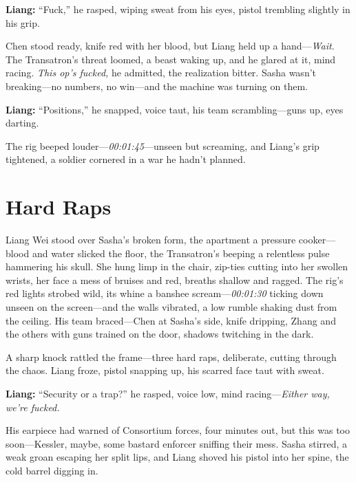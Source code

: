 \documentclass[12pt]{book}
\begin{document}
\vspace{0.5em}
\textbf{Liang:} “Fuck,” he rasped, wiping sweat from his eyes, pistol trembling slightly in his grip.

Chen stood ready, knife red with her blood, but Liang held up a hand—\emph{Wait.} The Transatron’s threat loomed, a beast waking up, and he glared at it, mind racing. \emph{This op’s fucked,} he admitted, the realization bitter. Sasha wasn’t breaking—no numbers, no win—and the machine was turning on them. 

\vspace{0.5em}
\textbf{Liang:} “Positions,” he snapped, voice taut, his team scrambling—guns up, eyes darting.

The rig beeped louder—\emph{00:01:45}—unseen but screaming, and Liang’s grip tightened, a soldier cornered in a war he hadn’t planned.

\vspace{1em}

\section{Hard Raps}

Liang Wei stood over Sasha’s broken form, the apartment a pressure cooker—blood and water slicked the floor, the Transatron’s beeping a relentless pulse hammering his skull. She hung limp in the chair, zip-ties cutting into her swollen wrists, her face a mess of bruises and red, breaths shallow and ragged. The rig’s red lights strobed wild, its whine a banshee scream—\emph{00:01:30} ticking down unseen on the screen—and the walls vibrated, a low rumble shaking dust from the ceiling. His team braced—Chen at Sasha’s side, knife dripping, Zhang and the others with guns trained on the door, shadows twitching in the dark.

A sharp knock rattled the frame—three hard raps, deliberate, cutting through the chaos. Liang froze, pistol snapping up, his scarred face taut with sweat. 

\vspace{0.5em}
\textbf{Liang:} “Security or a trap?” he rasped, voice low, mind racing—\emph{Either way, we’re fucked.}

His earpiece had warned of Consortium forces, four minutes out, but this was too soon—Kessler, maybe, some bastard enforcer sniffing their mess. Sasha stirred, a weak groan escaping her split lips, and Liang shoved his pistol into her spine, the cold barrel digging in. 
\end{document}
